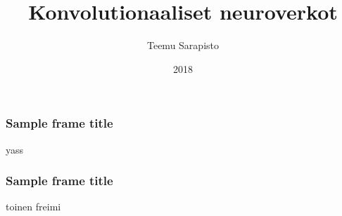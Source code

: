 \documentclass{beamer}
\title{Konvolutionaaliset neuroverkot}
\author{Teemu Sarapisto}
\institute{Helsingin Yliopisto}
\date{2018}
\begin{document}
\frame{\titlepage}

\begin{frame}
    \frametitle{Sample frame title}
    yass
\end{frame}
\begin{frame}
    \frametitle{Sample frame title}
   toinen freimi 
\end{frame}
\end{document}

